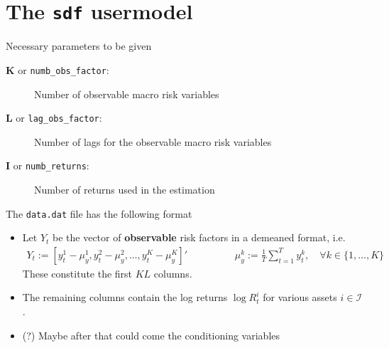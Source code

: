 \documentclass[11pt, letterpaper, notitlepage]{article}
\begin{document}
\begin{enumerate}
\begin{itemize}
\end{itemize}

\end{enumerate} 

\pagebreak


\section{The \texttt{sdf} usermodel}

Necessary parameters to be given 
\begin{description}
\item[$\mathbf{K}$ or \texttt{numb\_obs\_factor}:] Number of observable macro risk variables
\item[$\mathbf{L}$ or \texttt{lag\_obs\_factor}:] Number of lags for the observable macro risk variables
\item[$\mathbf{I}$ or \texttt{numb\_returns}:] Number of returns used in the estimation
\end{description}



The \texttt{data.dat} file has the following format
\begin{itemize}
\item Let $Y_t$ be the vector of \textbf{observable} risk factors in a demeaned format, i.e.
\begin{align*}
Y_t := \left[ y_t^1 - \mu^1_y, y_t^2 - \mu^2_y, \dots, y_t^K - \mu^K_y \right]'\hspace{2cm} \mu_y^k := \frac{1}{T}\sum_{t=1}^{T} y^k_t,\quad \forall k\in\{1, \dots, K\}
\end{align*} 
These constitute the first $KL$ columns.
\item The remaining columns contain the log returns $\log R^i_t$ for various assets $i\in \mathcal{I}$.
\item (?) Maybe after that could come the conditioning variables
\end{itemize}
\end{document}
